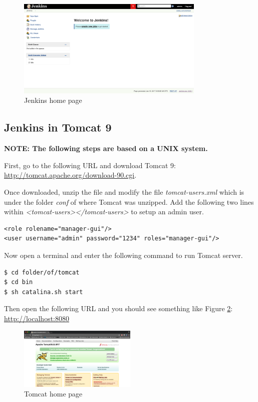 \begin{figure}[H]
	\centering
    \includegraphics[width=0.8\textwidth]{grafiken/jenkins-04}
    \caption{Jenkins home page}
    \label{fig:jenkins-04}
\end{figure}

\subsection{Jenkins in Tomcat 9}
\textbf{NOTE: The following steps are based on a UNIX system.}

First, go to the following URL and download Tomcat 9: \url{http://tomcat.apache.org/download-90.cgi}.

Once downloaded, unzip the file and modify the file \emph{tomcat-users.xml} which is under the folder \emph{conf} of where Tomcat was unzipped. Add the following two lines within \emph{<tomcat-users></tomcat-users>} to setup an admin user.

\begin{verbatim}
<role rolename="manager-gui"/>
<user username="admin" password="1234" roles="manager-gui"/>
\end{verbatim}

Now open a terminal and enter the following command to run Tomcat server.

\begin{verbatim}
$ cd folder/of/tomcat
$ cd bin
$ sh catalina.sh start
\end{verbatim}

Then open the following URL and you should see something like Figure \ref{fig:tomcat-01}: \url{http://localhost:8080}

\begin{figure}[H]
	\centering
    \includegraphics[width=0.5\textwidth]{grafiken/tomcat-01}
    \caption{Tomcat home page}
    \label{fig:tomcat-01}
\end{figure}

